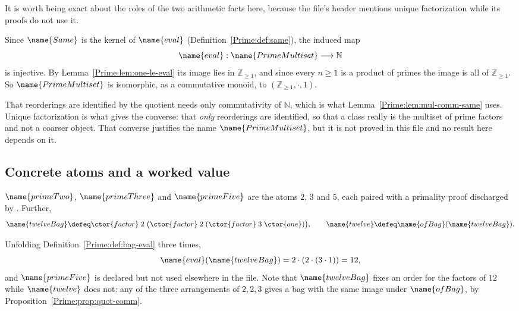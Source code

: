 \begin{remark}
\label{Prime:rem:ufd}
It is worth being exact about the roles of the two arithmetic facts here,
because the file's header mentions unique factorization while its proofs do
not use it.

Since $\name{Same}$ is the kernel of $\name{eval}$
(Definition~\ref{Prime:def:same}), the induced map
\[
  \name{eval} : \name{PrimeMultiset} \longrightarrow \mathbb{N}
\]
is injective.  By Lemma~\ref{Prime:lem:one-le-eval} its image lies in
$\mathbb{Z}_{\geq 1}$, and since every $n \geq 1$ is a product of primes the
image is all of $\mathbb{Z}_{\geq 1}$.  So $\name{PrimeMultiset}$ is
isomorphic, as a commutative monoid, to $(\mathbb{Z}_{\geq 1}, \cdot, 1)$.

That reorderings are identified by the quotient needs only commutativity of
$\mathbb{N}$, which is what Lemma~\ref{Prime:lem:mul-comm-same} uses.  Unique
factorization is what gives the converse: that \emph{only} reorderings are
identified, so that a class really is the multiset of prime factors and not a
coarser object.  That converse justifies the name $\name{PrimeMultiset}$, but
it is not proved in this file and no result here depends on it.
\end{remark}

\subsection{Concrete atoms and a worked value}

\begin{definition}\label{Prime:def:concrete}
$\name{primeTwo}$, $\name{primeThree}$ and $\name{primeFive}$ are the atoms
$2$, $3$ and $5$, each paired with a primality proof discharged by
.  Further,
\[
  \name{twelveBag} \defeq
    \ctor{factor}\;2\;\bigl(\ctor{factor}\;2\;
      (\ctor{factor}\;3\;\ctor{one})\bigr),
  \qquad
  \name{twelve} \defeq \name{ofBag}(\name{twelveBag}).
\]
\end{definition}

Unfolding Definition~\ref{Prime:def:bag-eval} three times,
\[
  \name{eval}(\name{twelveBag}) = 2 \cdot (2 \cdot (3 \cdot 1)) = 12,
\]
and $\name{primeFive}$ is declared but not used elsewhere in the file.  Note
that $\name{twelveBag}$ fixes an order for the factors of $12$ while
$\name{twelve}$ does not: any of the three arrangements of $2, 2, 3$ gives a
bag with the same image under $\name{ofBag}$, by
Proposition~\ref{Prime:prop:quot-comm}.

